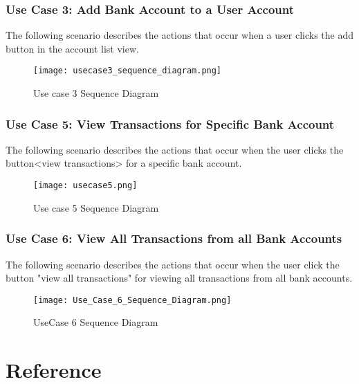 \documentclass[12pt]{article}
\begin{document}
\clearpage

\subsubsection{Use Case 3: Add Bank Account to a User Account}

The following scenario describes the actions that occur when a user clicks the add button in the account list view.

\begin{figure}[H]
\texttt{[image: usecase3\_sequence\_diagram.png]}
\caption{Use case 3 Sequence Diagram}
\label{fig:use-case-3-sequence-diagram}
\end{figure}

\clearpage

\subsubsection{Use Case 5: View Transactions for Specific Bank Account}

The following scenario describes the actions that occur when the user clicks the button<view transactions> for a specific bank account.

\begin{figure}[H]
\texttt{[image: usecase5.png]}
\caption{Use case 5 Sequence Diagram}
\label{fig:use-case-5-sequence-diagram}
\end{figure}

\clearpage

\clearpage

\subsubsection{Use Case 6: View All Transactions from all Bank Accounts}

The following scenario describes the actions that occur when the user click the button "view all transactions" for viewing all transactions from all bank accounts.

\begin{figure}[H]
\texttt{[image: Use\_Case\_6\_Sequence\_Diagram.png]}
\caption{UseCase 6 Sequence Diagram}
\label{fig:use-case-6-sequence-diagram}
\end{figure}

\clearpage

\section{Reference}
\end{document}
